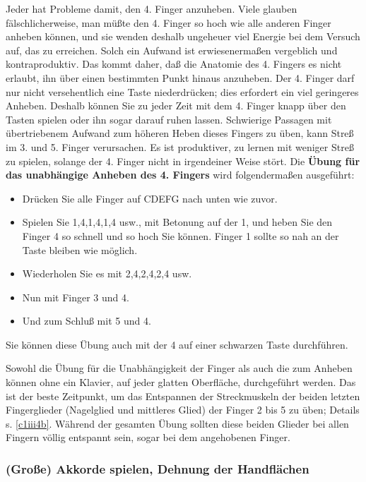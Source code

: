 Jeder hat Probleme damit, den 4. Finger anzuheben.
Viele glauben fälschlicherweise, man müßte den 4. Finger so hoch wie alle anderen Finger anheben können, und sie wenden deshalb ungeheuer viel Energie bei dem Versuch auf, das zu erreichen.
Solch ein Aufwand ist erwiesenermaßen vergeblich und kontraproduktiv.
Das kommt daher, daß die Anatomie des 4. Fingers es nicht erlaubt, ihn über einen bestimmten Punkt hinaus anzuheben.
Der 4. Finger darf nur nicht versehentlich eine Taste niederdrücken; dies erfordert ein viel geringeres Anheben.
Deshalb können Sie zu jeder Zeit mit dem 4. Finger knapp über den Tasten spielen oder ihn sogar darauf ruhen lassen.
Schwierige Passagen mit übertriebenem Aufwand zum höheren Heben dieses Fingers zu üben, kann Streß im 3. und 5. Finger verursachen.
Es ist produktiver, zu lernen mit weniger Streß zu spielen, solange der 4. Finger nicht in irgendeiner Weise stört.
\label{c1iii7finger4}
Die \textbf{Übung für das unabhängige Anheben des 4. Fingers} wird folgendermaßen ausgeführt:

\begin{itemize} 
 \item Drücken Sie alle Finger auf CDEFG nach unten wie zuvor.
 \item Spielen Sie 1,4,1,4,1,4 usw., mit Betonung auf der 1, und heben Sie den Finger 4 so schnell und so hoch Sie können.
 Finger 1 sollte so nah an der Taste bleiben wie möglich.
 \item Wiederholen Sie es mit 2,4,2,4,2,4 usw.
 \item Nun mit Finger 3 und 4.
 \item Und zum Schluß mit 5 und 4.
 \end{itemize}
Sie können diese Übung auch mit der 4 auf einer schwarzen Taste durchführen.

Sowohl die Übung für die Unabhängigkeit der Finger als auch die zum Anheben können ohne ein Klavier, auf jeder glatten Oberfläche, durchgeführt werden.
Das ist der beste Zeitpunkt, um das Entspannen der Streckmuskeln der beiden letzten Fingerglieder (Nagelglied und mittleres Glied) der Finger 2 bis 5 zu üben; Details s. \hyperref[c1iii4b]{\autoref{c1iii4b}}.
Während der gesamten Übung sollten diese beiden Glieder bei allen Fingern völlig entspannt sein, sogar bei dem angehobenen Finger.
 

\subsubsection{(Große) Akkorde spielen, Dehnung der Handflächen}
\label{c1iii7e}

